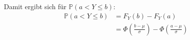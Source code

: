 \documentclass[a4paper]{scrartcl}
\newcommand{\dif}{\ \mathrm{d}}
\def \blattnr {5}
\begin{document}
\begin{enumerate}[label=\bfseries \blattnr.\arabic*]
\begin{enumerate}
	      Damit ergibt sich für $\mathbb{P}(a < Y \leq b)$:
	      \begin{equation*}
		\begin{split}
		  \mathbb{P}(a < Y \leq b)
		  &= F_Y(b) - F_Y(a) \\
		  &= \Phi\left( \frac{b - \mu}\sigma\right) - \Phi\left(\frac{a-\mu}\sigma\right) %
		 \end{split}
	      \end{equation*}
	  

\end{enumerate}
\end{enumerate}
\end{document}
